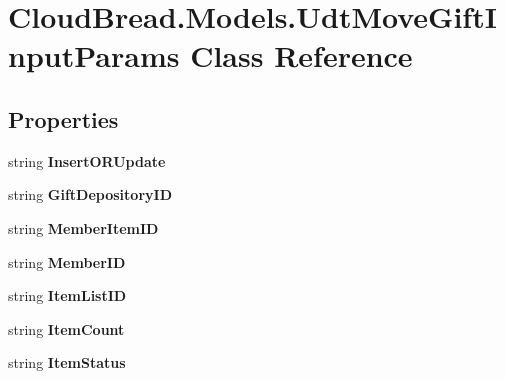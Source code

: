 \hypertarget{a00112}{}\section{Cloud\+Bread.\+Models.\+Udt\+Move\+Gift\+Input\+Params Class Reference}
\label{a00112}
\subsection*{Properties}
\begin{DoxyCompactItemize}
\item 
string {\bfseries Insert\+O\+R\+Update}\hypertarget{a00112_a156b7777ee1ef7b56edfc59d64a4c9ba}{}\label{a00112_a156b7777ee1ef7b56edfc59d64a4c9ba}

\item 
string {\bfseries Gift\+Depository\+ID}\hypertarget{a00112_acd6fe2c76ea0263e2e407dd8ba43307e}{}\label{a00112_acd6fe2c76ea0263e2e407dd8ba43307e}

\item 
string {\bfseries Member\+Item\+ID}\hypertarget{a00112_a14c997d6e904cb16189872e9208e40e0}{}\label{a00112_a14c997d6e904cb16189872e9208e40e0}

\item 
string {\bfseries Member\+ID}\hypertarget{a00112_a1ec8755e1aada960ca7f54d6c57d4441}{}\label{a00112_a1ec8755e1aada960ca7f54d6c57d4441}

\item 
string {\bfseries Item\+List\+ID}\hypertarget{a00112_a7f8031f1bf49ecc2cf7d923bd2593376}{}\label{a00112_a7f8031f1bf49ecc2cf7d923bd2593376}

\item 
string {\bfseries Item\+Count}\hypertarget{a00112_a9fdc02e2c0cbe4640900845d2c3185a9}{}\label{a00112_a9fdc02e2c0cbe4640900845d2c3185a9}

\item 
string {\bfseries Item\+Status}\hypertarget{a00112_a66228c3a786f801637575610559fb042}{}\label{a00112_a66228c3a786f801637575610559fb042}


\end{DoxyCompactItemize}
